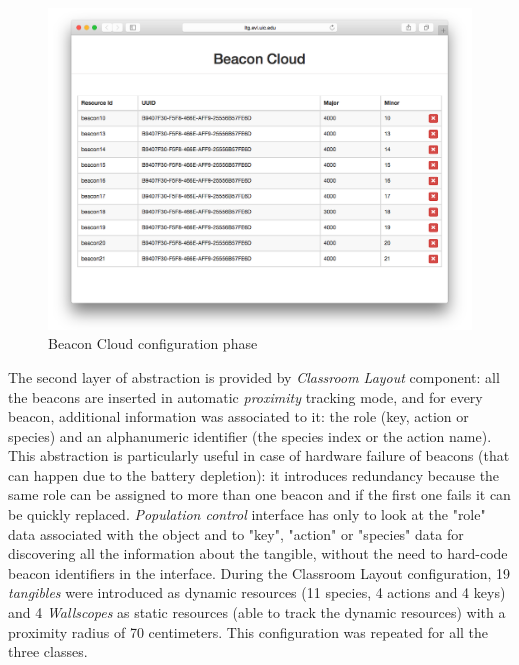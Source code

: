 \begin{figure}
\centering
\includegraphics[width=4.5in]{images/wallcology-beacon-cloud.png}
\caption{Beacon Cloud configuration phase}
\label{fig:wallcology_beacon_cloud}
\end{figure}

The second layer of abstraction is provided by \textit{Classroom Layout} component: all the beacons are inserted in automatic \textit{proximity} tracking mode, and for every beacon, additional information was associated to it: the role (key, action or species) and an alphanumeric identifier (the species index or the action name). This abstraction is particularly useful in case of hardware failure of beacons (that can happen due to the battery depletion): it introduces redundancy because the same role can be assigned to more than one beacon and if the first one fails it can be quickly replaced. \textit{Population control} interface has only to look at the "role" data associated with the object and to "key", "action" or "species" data for discovering all the information about the tangible, without the need to hard-code beacon identifiers in the interface. During the Classroom Layout configuration, 19 \textit{tangibles} were introduced as dynamic resources (11 species, 4 actions and 4 keys) and 4 \textit{Wallscopes} as static resources (able to track the dynamic resources) with a proximity radius of 70 centimeters. This configuration was repeated for all the three classes.

